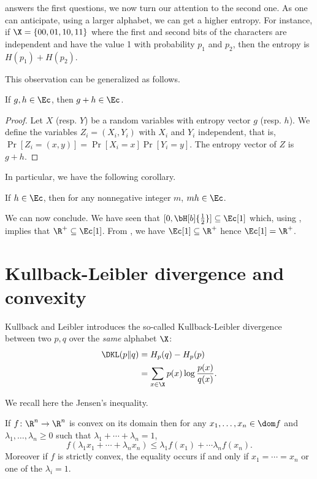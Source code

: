 \documentclass[11pt,twoside,a4paper,openright]{uclouvain-thesis}
\begin{document}
 answers the first questions, we now turn our attention to the second one.
As one can anticipate, using a larger alphabet, we can get a higher entropy.
For instance, if $\X = \{00, 01, 10, 11\}$ where the first and second bits of the characters are independent and have the value 1 with probability $p_1$ and $p_2$, then the entropy is $H(p_1) + H(p_2)$.

This observation can be generalized as follows.
\begin{mylem}
  \label{lem:add}
  If $g, h \in \Ec$, then $g + h \in \Ec$.
  \begin{proof}
    Let $X$ (resp. $Y$) be a random variables with entropy vector $g$ (resp. $h$).
    We define the variables $Z_i = (X_i, Y_i)$ with $X_i$ and $Y_i$ independent,
    that is, $\Pr[Z_i = (x,y)] = \Pr[X_i = x]\Pr[Y_i = y]$.
    The entropy vector of $Z$ is $g + h$.
  \end{proof}
\end{mylem}
In particular, we have the following corollary.
\begin{mycoro}
  \label{coro:nonnegativeintegermult}
  If $h \in \Ec$, then for any nonnegative integer $m$, $mh \in \Ec$.
\end{mycoro}

We can now conclude.
We have seen that $[0, \bH[b]{\frac{1}{2}}] \subseteq \Ec[1]$ which, using ,
implies that $\R^+ \subseteq \Ec[1]$.
From , we have $\Ec[1] \subseteq \R^+$ hence $\Ec[1] = \R^+$.

\section{Kullback-Leibler divergence and convexity}
\label{sec:kl}
Kullback and Leibler introduces the so-called Kullback-Leibler divergence \cite{kullback1951information} between two \pmfs{} $p, q$ over the \emph{same} alphabet $\X$:
\begin{align*}
  \DKL(p \| q) & = H_p(q) - H_p(p)\\
               & = \sum_{x \in \X} p(x) \log\frac{p(x)}{q(x)}.
\end{align*}

We recall here the Jensen's inequality.
\begin{mytheo}
  \label{theo:jensen}
  If $f \colon \R^n \to \R^n$ is convex on its domain then
  for any $x_1, \ldots, x_n \in \dom f$ and $\lambda_1, \ldots, \lambda_n \geq 0$ such that $\lambda_1 + \cdots + \lambda_n = 1$,
  \begin{equation}
    \label{eq:jensen}
    f(\lambda_1x_1 + \cdots + \lambda_nx_n) \leq \lambda_1f(x_1) + \cdots \lambda_nf(x_n).
  \end{equation}
  Moreover if $f$ is strictly convex, the equality occurs if and only if $x_1 = \cdots = x_n$ or one of the $\lambda_i = 1$.
\end{mytheo}
\end{document}
